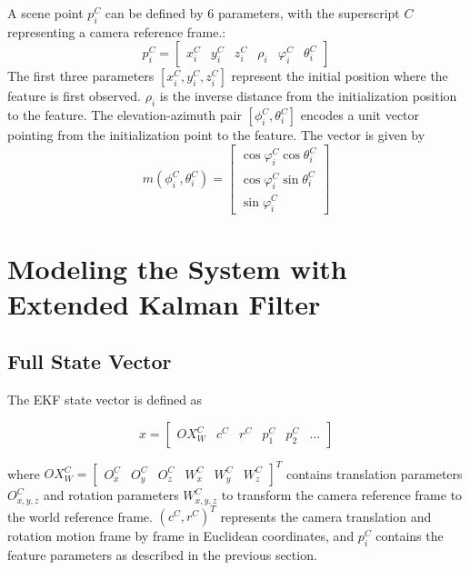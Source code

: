 A scene point $p_{i}^{C}$ can be defined by 6 parameters, with the 
superscript $C$ representing a camera reference frame.:
\begin{equation}
p_{i}^{C}=\begin{bmatrix}
x_{i}^{C} & y_{i}^{C} & z_{i}^{C} & \rho _{i} & \varphi _{i}^{C} & 
\theta _{i}^{C} 
\end{bmatrix}
\end{equation}
The first three parameters $[x_{i}^{C}, y_{i}^{C}, z_{i}^{C}]$
represent the initial position where the feature is first observed.
$\rho _{i}$ is the inverse distance from the initialization position
to the feature. The elevation-azimuth pair $[\phi_{i}^{C},
\theta_{i}^{C}]$ encodes a unit vector pointing from the
initialization point to the feature. The vector is given by
\begin{equation}
m(\phi_{i}^{C}, \theta_{i}^{C})=\begin{bmatrix}
\cos\varphi_{i}^{C}\cos\theta _{i}^{C} \\
\cos\varphi_{i}^{C}\sin\theta _{i}^{C} \\
\sin\varphi_{i}^{C}
\end{bmatrix}
\end{equation}

\section{Modeling the System with Extended Kalman 
Filter}

\subsection{Full State Vector}

The EKF state vector is defined as 

\begin{equation}
x=\begin{bmatrix}
OX_{W}^{C} & c^{C} & r^{C} & p_{1}^{C} & p_{2}^{C} & \ldots 
\end{bmatrix}
\end{equation}

\noindent where $OX_{W}^{C}= \begin{bmatrix}O_{x}^{C} & O_{y}^{C} &
  O_{z}^{C} & W_{x}^{C} & W_{y}^{C} & W_{z}^{C} \end{bmatrix}^{T}$
contains translation parameters $O_{x,y,z}^{C}$ and rotation
parameters $W_{x,y,z}^{C}$ to transform the camera reference frame to
the world reference frame. $\left(c^{C},r^{C}\right)^{T}$ represents
the camera translation and rotation motion frame by frame in Euclidean
coordinates, and $p_{i}^{C}$ contains the feature parameters as
described in the previous section.

